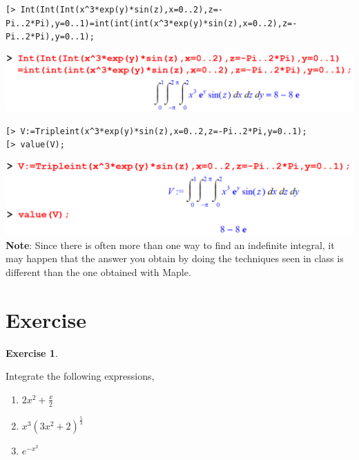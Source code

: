 \documentclass[
]{book}
\providecommand{\tightlist}{%
  \setlength{\itemsep}{0pt}\setlength{\parskip}{0pt}}
\theoremstyle{definition}
\theoremstyle{definition}
\theoremstyle{definition}
\newtheorem{exercise}{Exercise}[chapter]
\theoremstyle{definition}
\theoremstyle{remark}
\begin{document}
\begin{verbatim}
[> Int(Int(Int(x^3*exp(y)*sin(z),x=0..2),z=-Pi..2*Pi),y=0..1)=int(int(int(x^3*exp(y)*sin(z),x=0..2),z=-Pi..2*Pi),y=0..1);
\end{verbatim}

\includegraphics{figures/Lesson 6/fig26.png}

\begin{verbatim}
[> V:=Tripleint(x^3*exp(y)*sin(z),x=0..2,z=-Pi..2*Pi,y=0..1);
[> value(V);
\end{verbatim}

\includegraphics{figures/Lesson 6/fig27.png}
\textbf{Note}: Since there is often more than one way to find an indefinite integral, it may happen that the answer you obtain by doing the techniques seen in class is different than the one obtained with Maple.

\section{Exercise}\label{exercise-9}

\begin{exercise}
\protect\hypertarget{exr:unnamed-chunk-51}{}\label{exr:unnamed-chunk-51}

Integrate the following expressions,

\begin{enumerate}
\def\labelenumi{\roman{enumi}.}
\tightlist
\item
  \(2x^2 + \frac{x}{2}\)
\item
  \(x^3(3x^2 + 2)^{\frac{5}{3}}\)
\item
  \(e^{-x^2}\)
\end{enumerate}

\end{exercise}
\end{document}
